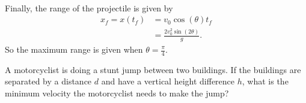 \documentclass[../newtonian_mechanics.tex]{subfiles}
\begin{document}
        \paragraph{}
        Finally, the range of the projectile is given by
        \begin{align}
            x_f = x(t_f) &= v_0\cos(\theta)t_f\\
            &= \frac{2v_0^2\sin(2\theta)}{g}.
        \end{align}
        So the maximum range is given when $\theta=\frac{\pi}{4}$.


        \begin{example}
            A motorcyclist is doing a stunt jump between two buildings.
            If the buildings are separated by a distance $d$ and have a vertical height difference $h$, what is the minimum velocity the motorcyclist needs to make the jump?
        \end{example}
        
\end{document}
